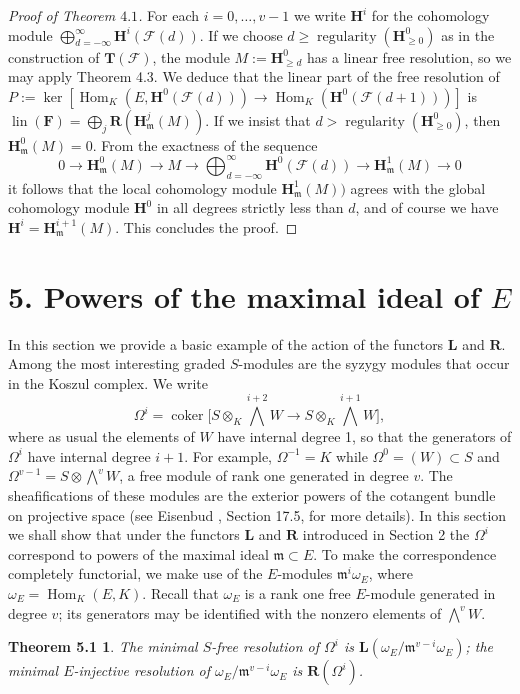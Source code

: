 \documentclass{tran-l}
\newcommand{\reg}{\operatorname{regularity}}
\newcommand{\coker}{\operatorname{coker}}
\newcommand{\myHom}{\operatorname{Hom}}
\newcommand{\lin}{\operatorname{lin}}
\newcommand{\F}{\mathcal{F}}
\newcommand{\FF}{\mathbf{F}}
\newcommand{\myH}{\mathbf{H}}
\newcommand{\LL}{\mathbf{L}}
\newcommand{\RR}{\mathbf{R}}
\newcommand{\TT}{\mathbf{T}}
\newcommand{\gm}{{\mathfrak{m}}}
\theoremstyle{plain}
\newtheorem*{theorem19}{Theorem 5.1}
\theoremstyle{remark}
\theoremstyle{definition}
\begin{document}
\begin{proof}[Proof of Theorem $4.1$] For each $i=0, \dots , v-1$ we write $\myH ^{i}$ for the
cohomology module $\bigoplus _{d=-\infty }^{\infty }\myH ^{i}(\F (d))$.
If we choose $d\geq \reg (\myH ^{0}_{\geq 0})$  as in the
construction of $\TT (\F )$, the module $M:=\myH ^{0}_{\geq d}$
has a linear free resolution, so we may
apply Theorem 4.3. We deduce that
the linear part of the  free resolution of
$P:=\ker [\myHom _{K}(E,\myH ^{0}(\F (d)))\to \myHom _{K}(\myH ^{0}(\F (d+1)))]$
is
$\lin (\FF )=\bigoplus _{j}\RR (\myH ^{j}_{\gm }(M)).
$
If we insist that $d>\reg (\myH ^{0}_{\geq 0})$,
then $\myH ^{0}_{\gm }(M)=0$. From the exactness of the
sequence
\begin{equation*}0\to \myH ^{0}_{\gm }(M)\to M\to \bigoplus _{d=-\infty }^{\infty }\myH ^{0}(\F (d))\to \myH ^{1}_{\gm }(M)\to 0
\end{equation*}
it follows that
the local cohomology module $\myH ^{1}_{\gm }(M))$
agrees with the global cohomology module
$\myH ^{0}$ in all degrees strictly less than $d$,
and of course we have
$\myH ^{i}=\myH ^{i+1}_{\gm }(M)$. This concludes the proof.
\end{proof}


\section*{5. Powers of the maximal ideal of $E$}

In this section we provide a basic example of the
action of the functors $\LL $ and $\RR $.
Among the most interesting graded $S$-modules are the syzygy modules
that occur in the Koszul complex. We write
\begin{equation*}\Omega ^{i}=\coker \bigl [ S\otimes _{K}
\textstyle{\bigwedge ^{i+2}}W
\to S\otimes _{K}\textstyle{\bigwedge ^{i+1}}W\bigr ],
\end{equation*}
where as usual the elements of $W$ have internal degree 1, so that
the generators of $\Omega ^{i}$ have internal degree $i+1$. For example,
 $\Omega ^{-1}=K$ while $\Omega ^{0}=(W)\subset S$
and $\Omega ^{v-1}=S\otimes \bigwedge ^{v}W$, a free module of rank one
generated in degree $v$.
The sheafifications of these modules are the exterior
powers of the cotangent bundle on projective space
(see Eisenbud \cite{Eis}, Section 17.5, for more details).
In this section we shall show that
under the functors $\LL $ and $\RR $ introduced
in Section 2
the $\Omega ^{i}$
correspond to powers of the maximal ideal $\gm \subset E$. To
make the correspondence completely functorial, we make use of
the $E$-modules $\gm ^{i}\omega _{E}$, where
$\omega _{E}=\myHom _{K}(E,K)$. Recall that $\omega _{E}$ is a
rank one free $E$-module generated in degree $v$; its
generators may be identified with the nonzero elements of $\bigwedge ^{v}W$.
\begin{theorem19}
The minimal $S$-free resolution
of $\Omega ^{i}$ is $\LL (\omega _{E}/\gm ^{v-i}\omega _{E})$;
the minimal $E$-injective
resolution of $\omega _{E}/\gm ^{v-i}\omega _{E}$ is $\RR (\Omega ^{i})$.
\end{theorem19}
\end{document}
